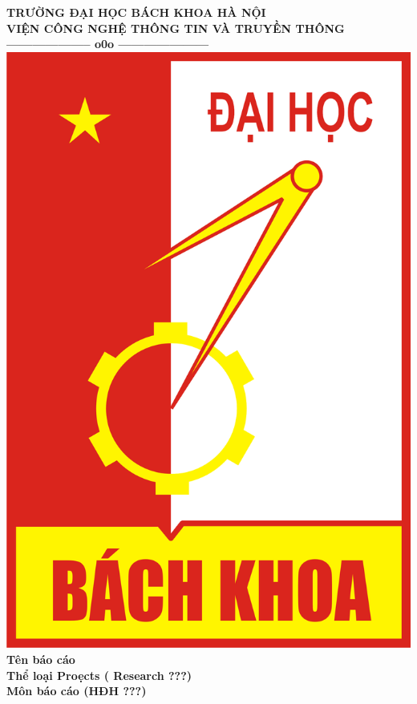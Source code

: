 \documentclass[12pt]{extreport}
\begin{document}
\thispagestyle{empty}
\thisfancypage{
	\setlength{\fboxsep}{0pt}
	\fbox}{}

\begin{center}

	{\fontsize{13pt}{1}\selectfont\textbf{TRƯỜNG ĐẠI HỌC BÁCH KHOA HÀ NỘI}}
	\\
	{\fontsize{13pt}{1}\selectfont\textbf{VIỆN CÔNG NGHỆ THÔNG TIN VÀ TRUYỀN THÔNG}}
	\\
	\textbf{--------------------  o0o  ---------------------}\\[1cm]
	\includegraphics[scale=0.5]{images/Logo_Hust.png} \\[1.2cm]
	\textbf{{\large Tên báo cáo}}
	\textbf{}\\[1cm]
	\textbf{{\large Thể loại Proẹcts ( Research ???)}}\\[0.2cm]
	\textbf{{\large Môn báo cáo (HĐH ???)}}\\[1cm]
\end{center}
\end{document}
